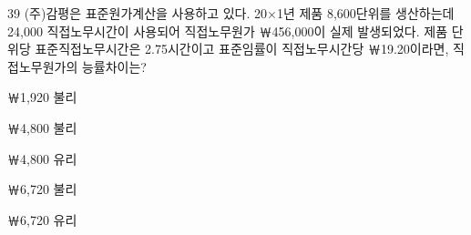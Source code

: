 \begin{question}{39}
(주)감평은 표준원가계산을 사용하고 있다. 20×1년 제품 8,600단위를 생산하는데 24,000 직접노무시간이 사용되어 직접노무원가 ￦456,000이 실제 발생되었다. 제품 단위당 표준직접노무시간은 2.75시간이고 표준임률이 직접노무시간당 ￦19.20이라면, 직접노무원가의 능률차이는?
\begin{choices}
  \item ￦1,920 불리
  \item ￦4,800 불리
  \item ￦4,800 유리
  \item ￦6,720 불리
  \item ￦6,720 유리
\end{choices}
\end{question}
